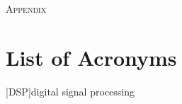 \documentclass[reqno,onecolumn,oneside]{paper}
\newcommand{\<}{\ensuremath{\langle}}
\renewcommand{\>}{\ensuremath{\rangle}}
\begin{document}
\newpage

\appendix

\begin{center}
\textsc{Appendix}
\end{center}

\section*{List of Acronyms}
\begin{acronym}
[DSP]{digital signal processing}
\end{acronym}




\end{document}
